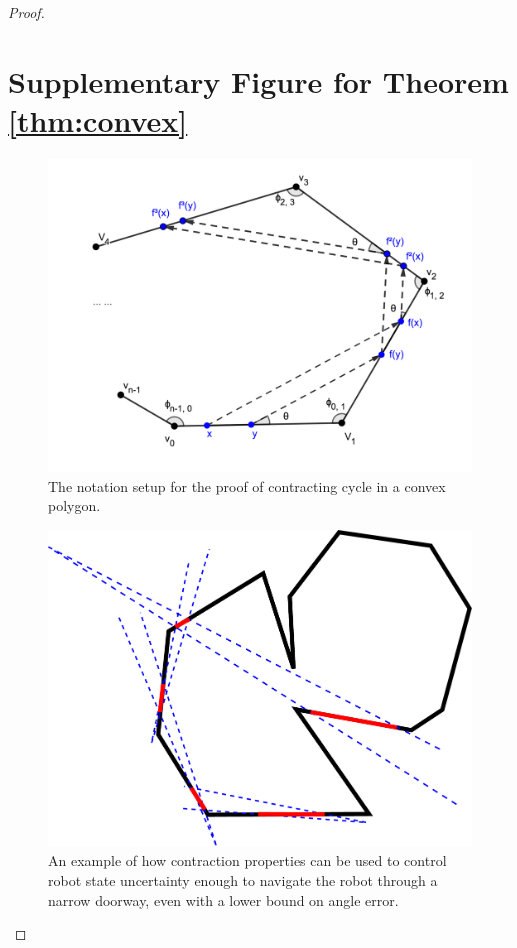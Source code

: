 \documentclass[]{styles/svproc}  %
\begin{document}
\begin{appendix}
\begin{proof}
\section{Supplementary Figure for Theorem \ref{thm:convex}}

\begin{figure}
    \includegraphics[width=0.6\linewidth]{figures/convex_cycle.png}
    \centering
    \caption{The notation setup for the proof of contracting cycle in a convex polygon.\label{fig:conv_cycle}}
    \centering
\end{figure}

\begin{figure}
    \includegraphics[width=0.6\linewidth]{figures/bounce_preimages.pdf}
    \centering
    \caption{An example of how contraction properties can be used to control
robot state uncertainty enough to navigate the robot through a narrow doorway,
even with a lower bound on angle error.}
\label{fig:preimage_example}
\end{figure}


\end{proof}

\end{appendix}
\end{document}
